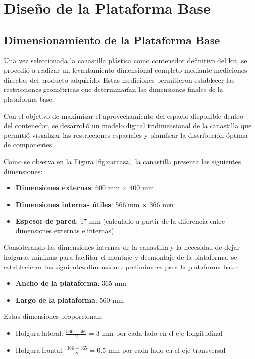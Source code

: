 \section{Diseño de la Plataforma Base}

\subsection{Dimensionamiento de la Plataforma Base}

Una vez seleccionada la canastilla plástica como contenedor definitivo del kit, se procedió a realizar un levantamiento dimensional completo mediante mediciones directas del producto adquirido. Estas mediciones permitieron establecer las restricciones geométricas que determinarían las dimensiones finales de la plataforma base.

Con el objetivo de maximizar el aprovechamiento del espacio disponible dentro del contenedor, se desarrolló un modelo digital tridimensional de la canastilla que permitió visualizar las restricciones espaciales y planificar la distribución óptima de componentes.

Como se observa en la Figura \ref{fig:carcasa}, la canastilla presenta las siguientes dimensiones:

\begin{itemize}
    \item \textbf{Dimensiones externas}: 600 mm × 400 mm
    \item \textbf{Dimensiones internas útiles}: 566 mm × 366 mm
    \item \textbf{Espesor de pared}: 17 mm (calculado a partir de la diferencia entre dimensiones externas e internas)
\end{itemize}


Considerando las dimensiones internas de la canastilla y la necesidad de dejar holguras mínimas para facilitar el montaje y desmontaje de la plataforma, se establecieron las siguientes dimensiones preliminares para la plataforma base:

\begin{itemize}
    \item \textbf{Ancho de la plataforma}: 365 mm
    \item \textbf{Largo de la plataforma}: 560 mm
\end{itemize}

Estas dimensiones proporcionan:

\begin{itemize}
    \item Holgura lateral: $\frac{566 - 560}{2} = 3$ mm por cada lado en el eje longitudinal
    \item Holgura frontal: $\frac{366 - 365}{2} = 0.5$ mm por cada lado en el eje transversal
\end{itemize}

